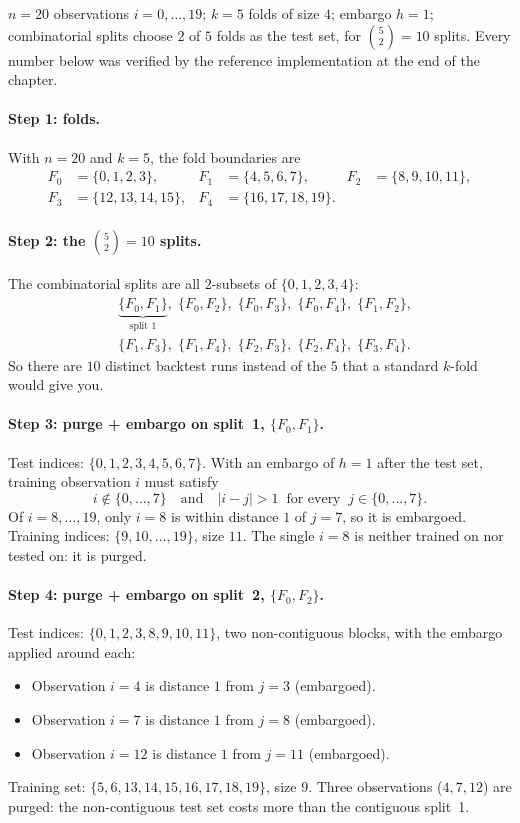$n = 20$ observations $i = 0, \ldots, 19$; $k = 5$ folds of size $4$;
embargo $h = 1$; combinatorial splits choose $2$ of $5$ folds as the
test set, for $\binom{5}{2} = 10$ splits. Every number below was
verified by the reference implementation at the end of the chapter.

\paragraph{Step 1: folds.} With $n = 20$ and $k = 5$, the fold
boundaries are
\begin{align*}
F_0 &= \{0,1,2,3\}, &
F_1 &= \{4,5,6,7\}, &
F_2 &= \{8,9,10,11\}, \\
F_3 &= \{12,13,14,15\}, &
F_4 &= \{16,17,18,19\}.
\end{align*}

\paragraph{Step 2: the $\binom{5}{2} = 10$ splits.}
The combinatorial splits are all $2$-subsets of $\{0,1,2,3,4\}$:
\begin{align*}
&\underbrace{\{F_0,F_1\}}_{\text{split }1},\;
\{F_0,F_2\},\;
\{F_0,F_3\},\;
\{F_0,F_4\},\;
\{F_1,F_2\},\\
&\{F_1,F_3\},\;
\{F_1,F_4\},\;
\{F_2,F_3\},\;
\{F_2,F_4\},\;
\{F_3,F_4\}.
\end{align*}
So there are $10$ distinct backtest runs instead of the $5$ that a
standard $k$-fold would give you.

\paragraph{Step 3: purge + embargo on split~1, $\{F_0, F_1\}$.}
Test indices: $\{0,1,2,3,4,5,6,7\}$. With an embargo of $h = 1$
after the test set, training observation $i$ must satisfy
\[
i \notin \{0,\ldots,7\}
  \quad \text{and}\quad
  |i - j| > 1 \;\;\text{for every}\;\; j \in \{0,\ldots,7\}.
\]
Of $i = 8, \ldots, 19$, only $i = 8$ is within distance $1$ of
$j = 7$, so it is embargoed. Training indices:
$\{9, 10, \ldots, 19\}$, size $11$. The single $i = 8$ is neither
trained on nor tested on: it is purged.

\paragraph{Step 4: purge + embargo on split~2, $\{F_0, F_2\}$.}
Test indices: $\{0,1,2,3,8,9,10,11\}$, two non-contiguous blocks,
with the embargo applied around each:
\begin{itemize}
  \item Observation $i = 4$ is distance $1$ from $j = 3$
  (embargoed).
  \item Observation $i = 7$ is distance $1$ from $j = 8$
  (embargoed).
  \item Observation $i = 12$ is distance $1$ from $j = 11$
  (embargoed).
\end{itemize}
Training set: $\{5, 6, 13, 14, 15, 16, 17, 18, 19\}$, size $9$.
Three observations ($4, 7, 12$) are purged: the non-contiguous
test set costs more than the contiguous split~1.

